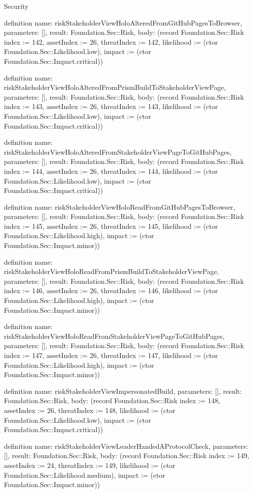 \begin{lexlean}{Security}
\begin{semanticmodule}
definition{
  name: riskStakeholderViewHoloAlteredFromGitHubPagesToBrowser,
  parameters: [],
  result: Foundation.Sec::Risk,
  body: (record Foundation.Sec::Risk {index := 142, assetIndex := 26, threatIndex := 142, likelihood := (ctor Foundation.Sec::Likelihood.low), impact := (ctor Foundation.Sec::Impact.critical)})
}

definition{
  name: riskStakeholderViewHoloAlteredFromPrismBuildToStakeholderViewPage,
  parameters: [],
  result: Foundation.Sec::Risk,
  body: (record Foundation.Sec::Risk {index := 143, assetIndex := 26, threatIndex := 143, likelihood := (ctor Foundation.Sec::Likelihood.low), impact := (ctor Foundation.Sec::Impact.critical)})
}

definition{
  name: riskStakeholderViewHoloAlteredFromStakeholderViewPageToGitHubPages,
  parameters: [],
  result: Foundation.Sec::Risk,
  body: (record Foundation.Sec::Risk {index := 144, assetIndex := 26, threatIndex := 144, likelihood := (ctor Foundation.Sec::Likelihood.low), impact := (ctor Foundation.Sec::Impact.critical)})
}

definition{
  name: riskStakeholderViewHoloReadFromGitHubPagesToBrowser,
  parameters: [],
  result: Foundation.Sec::Risk,
  body: (record Foundation.Sec::Risk {index := 145, assetIndex := 26, threatIndex := 145, likelihood := (ctor Foundation.Sec::Likelihood.high), impact := (ctor Foundation.Sec::Impact.minor)})
}

definition{
  name: riskStakeholderViewHoloReadFromPrismBuildToStakeholderViewPage,
  parameters: [],
  result: Foundation.Sec::Risk,
  body: (record Foundation.Sec::Risk {index := 146, assetIndex := 26, threatIndex := 146, likelihood := (ctor Foundation.Sec::Likelihood.high), impact := (ctor Foundation.Sec::Impact.minor)})
}

definition{
  name: riskStakeholderViewHoloReadFromStakeholderViewPageToGitHubPages,
  parameters: [],
  result: Foundation.Sec::Risk,
  body: (record Foundation.Sec::Risk {index := 147, assetIndex := 26, threatIndex := 147, likelihood := (ctor Foundation.Sec::Likelihood.high), impact := (ctor Foundation.Sec::Impact.minor)})
}

definition{
  name: riskStakeholderViewImpersonatedBuild,
  parameters: [],
  result: Foundation.Sec::Risk,
  body: (record Foundation.Sec::Risk {index := 148, assetIndex := 26, threatIndex := 148, likelihood := (ctor Foundation.Sec::Likelihood.low), impact := (ctor Foundation.Sec::Impact.critical)})
}

definition{
  name: riskStakeholderViewLeaderHandedAProtocolCheck,
  parameters: [],
  result: Foundation.Sec::Risk,
  body: (record Foundation.Sec::Risk {index := 149, assetIndex := 24, threatIndex := 149, likelihood := (ctor Foundation.Sec::Likelihood.medium), impact := (ctor Foundation.Sec::Impact.minor)})
}


\end{semanticmodule}
\end{lexlean}
